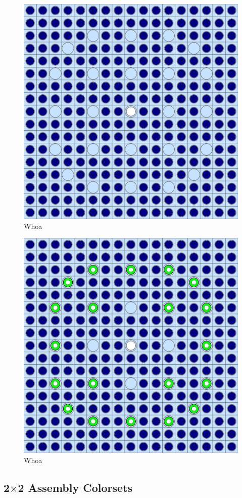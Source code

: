 \begin{figure}[h!]
  \centering
  \includegraphics[width=0.65\linewidth]{figures/benchmarks/assembly-31}
\caption[BEAVRS 3.1\% enriched assembly]{Whoa}
\label{fig:chap7-assm-31}
\end{figure}

\begin{figure}[h!]
  \centering
  \includegraphics[width=0.65\linewidth]{figures/benchmarks/assembly-31-20BPs}
\caption[BEAVRS 3.1\% enriched assembly with 20 \ac{BP}s]{Whoa}
\label{fig:chap7-assm-31-20BPs}
\end{figure}

\subsection{2$\times$2 Assembly Colorsets}
\label{subsec:chap7-2x2-colorsets}

